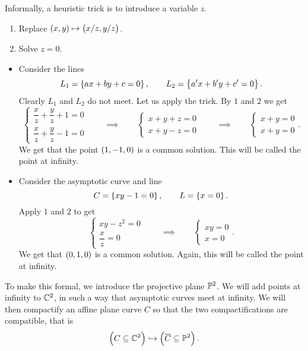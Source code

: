 Informally, a heuristic trick is to introduce a variable $ z $.
\begin{enumerate}
\item Replace $ \br{x, y} \mapsto \br{x / z, y / z} $.
\item Solve $ z = 0 $.
\end{enumerate}

\begin{example}
\hfill
\begin{itemize}
\item Consider the lines
$$ L_1 = \cbr{ax + by + c = 0}, \qquad L_2 = \cbr{a'x + b'y + c' = 0}. $$
Clearly $ L_1 $ and $ L_2 $ do not meet. Let us apply the trick. By $ 1 $ and $ 2 $ we get
$$
\begin{cases}
\dfrac{x}{z} + \dfrac{y}{z} + 1 = 0 \\
\dfrac{x}{z} + \dfrac{y}{z} - 1 = 0
\end{cases}
\qquad \implies \qquad
\begin{cases}
x + y + z = 0 \\
x + y - z = 0
\end{cases}
\qquad \implies \qquad
\begin{cases}
x + y = 0 \\
x + y = 0
\end{cases}.
$$
We get that the point $ \br{1, -1, 0} $ is a common solution. This will be called the point at infinity.
\item Consider the asymptotic curve and line
$$ C = \cbr{xy - 1 = 0}, \qquad L = \cbr{x = 0}. $$
Apply $ 1 $ and $ 2 $ to get
$$
\begin{cases}
xy - z^2 = 0 \\
\dfrac{x}{z} = 0
\end{cases}
\qquad \implies \qquad
\begin{cases}
xy = 0 \\
x = 0
\end{cases}.
$$
We get that $ \br{0, 1, 0} $ is a common solution. Again, this will be called the point at infinity.
\end{itemize}
\end{example}

To make this formal, we introduce the projective plane $ \mathbb{P}^2 $. We will add points at infinity to $ \mathbb{C}^2 $, in such a way that asymptotic curves meet at infinity. We will then compactify an affine plane curve $ C $ so that the two compactifications are compatible, that is
$$ \br{C \subseteq \CC^2} \hookrightarrow \br{\overline{C} \subseteq \PP^2}. $$


